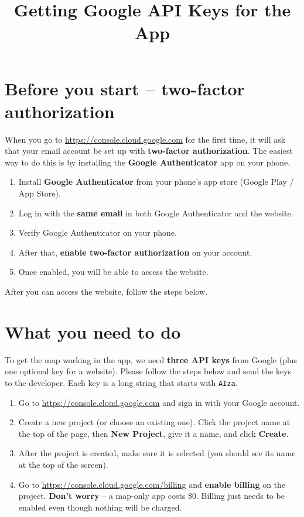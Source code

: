 \documentclass[12pt,a4paper]{article}
\title{\textbf{Getting Google API Keys for the App}}
\author{}
\date{}
\begin{document}
\maketitle
\vspace{-2em}

\section*{Before you start -- two-factor authorization}

When you go to \url{https://console.cloud.google.com} for the first time, it
will ask that your email account be set up with \textbf{two-factor
authorization}. The easiest way to do this is by installing the
\textbf{Google Authenticator} app on your phone.

\begin{enumerate}
  \item Install \textbf{Google Authenticator} from your phone's app store
        (Google Play / App Store).
  \item Log in with the \textbf{same email} in both Google Authenticator and
        the website.
  \item Verify Google Authenticator on your phone.
  \item After that, \textbf{enable two-factor authorization} on your account.
  \item Once enabled, you will be able to access the website.
\end{enumerate}

After you can access the website, follow the steps below.

\section*{What you need to do}

To get the map working in the app, we need \textbf{three API keys} from
Google (plus one optional key for a website). Please follow the steps below
and send the keys to the developer. Each key is a long string that starts
with \texttt{AIza}.

\begin{enumerate}
  \item Go to \url{https://console.cloud.google.com} and sign in with your
        Google account.
  \item Create a new project (or choose an existing one). Click the project
        name at the top of the page, then \textbf{New Project}, give it a
        name, and click \textbf{Create}.
  \item After the project is created, make sure it is selected (you should see
        its name at the top of the screen).
  \item Go to \url{https://console.cloud.google.com/billing} and \textbf{enable
        billing} on the project. \textbf{Don't worry} -- a map-only app costs
        \$0. Billing just needs to be enabled even though nothing will be
        charged.
\end{enumerate}
\end{document}
